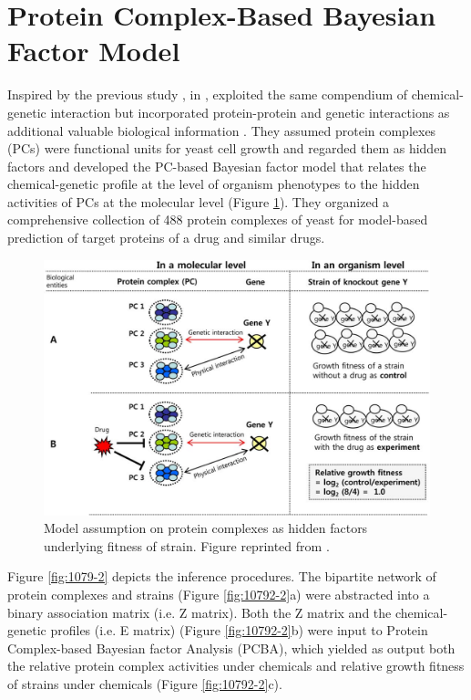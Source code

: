 \documentclass[12pt,conference,compsocconf]{../IEEEtran}
\begin{document}
\section{Protein Complex-Based Bayesian Factor Model}

Inspired by the previous study \citep{1078}, in \citeyear{1079},  exploited the same compendium of chemical-genetic interaction but incorporated protein-protein and genetic interactions as additional valuable biological information \citep{1079}. They assumed protein complexes (PCs) were functional units for yeast cell growth and regarded them as hidden factors and developed the PC-based Bayesian factor model that relates the chemical-genetic profile at the level of organism phenotypes to the hidden activities of PCs at the molecular level (Figure \ref{fig:1079-1}). They organized a comprehensive collection of 488 protein complexes of yeast for model-based prediction of target proteins of a drug and similar drugs.

\begin{figure}
\centering
\includegraphics[width=\linewidth]{1079-1.png}
\caption{Model assumption on protein complexes as hidden factors underlying fitness of strain. Figure reprinted from \citep{1079}.}
\label{fig:1079-1}
\end{figure}

Figure \ref{fig:1079-2} depicts the inference procedures. The bipartite network of protein complexes and strains (Figure \ref{fig:10792-2}a) were abstracted into a binary association matrix (i.e. Z matrix). Both the Z matrix and the chemical-genetic profiles (i.e. E matrix) (Figure \ref{fig:10792-2}b) were input to Protein Complex-based Bayesian factor Analysis (PCBA), which yielded as output both the relative protein complex activities under chemicals and relative growth fitness of strains under chemicals (Figure \ref{fig:10792-2}c).
\end{document}

